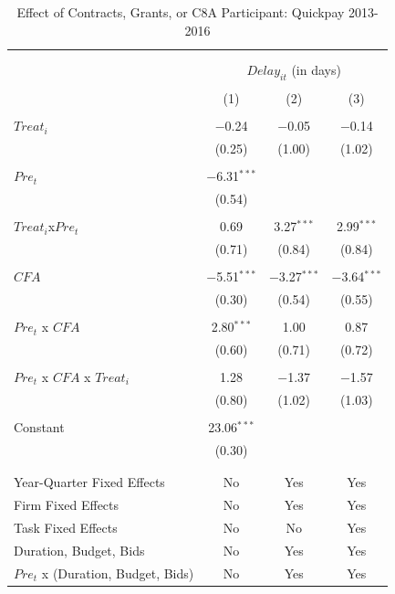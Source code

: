 \documentclass[
]{article}
\begin{document}
\begin{table}[H] \centering 
  \caption{Effect of Contracts, Grants, or C8A Participant: Quickpay 2013-2016} 
  \label{} 
\small 
\begin{tabular}{@{\extracolsep{-2pt}}lccc} 
\\[-1.8ex]\hline 
\hline \\[-1.8ex] 
\\[-1.8ex] & \multicolumn{3}{c}{$Delay_{it}$ (in days)} \\ 
\\[-1.8ex] & (1) & (2) & (3)\\ 
\hline \\[-1.8ex] 
 $Treat_i$ & $-$0.24 & $-$0.05 & $-$0.14 \\ 
  & (0.25) & (1.00) & (1.02) \\ 
  & & & \\ 
 $Pre_t$ & $-$6.31$^{***}$ &  &  \\ 
  & (0.54) &  &  \\ 
  & & & \\ 
 $Treat_i$x$Pre_t$ & 0.69 & 3.27$^{***}$ & 2.99$^{***}$ \\ 
  & (0.71) & (0.84) & (0.84) \\ 
  & & & \\ 
 $CFA$ & $-$5.51$^{***}$ & $-$3.27$^{***}$ & $-$3.64$^{***}$ \\ 
  & (0.30) & (0.54) & (0.55) \\ 
  & & & \\ 
 $Pre_t$ x $CFA$ & 2.80$^{***}$ & 1.00 & 0.87 \\ 
  & (0.60) & (0.71) & (0.72) \\ 
  & & & \\ 
 $Pre_t$ x $CFA$ x $Treat_i$ & 1.28 & $-$1.37 & $-$1.57 \\ 
  & (0.80) & (1.02) & (1.03) \\ 
  & & & \\ 
 Constant & 23.06$^{***}$ &  &  \\ 
  & (0.30) &  &  \\ 
  & & & \\ 
\hline \\[-1.8ex] 
Year-Quarter Fixed Effects & No & Yes & Yes \\ 
Firm Fixed Effects & No & Yes & Yes \\ 
Task Fixed Effects & No & No & Yes \\ 
Duration, Budget, Bids & No & Yes & Yes \\ 
$Pre_t$  x  (Duration, Budget, Bids) & No & Yes & Yes \\ 

\end{tabular}
\end{table}
\end{document}
